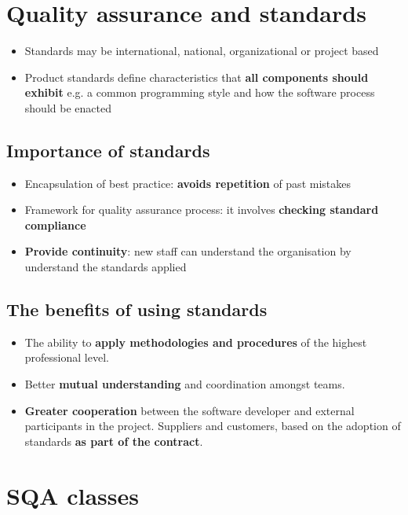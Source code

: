 \documentclass{article}
\begin{document}
\tableofcontents

\newpage

\section{Quality assurance and standards}
\begin{itemize}
  \item Standards may be international, national, organizational or project based
  \item Product standards define characteristics that \textbf{all components should exhibit} e.g. a common programming style and how the software process should be enacted
\end{itemize}

\subsection{Importance of standards}
\begin{itemize}
  \item Encapsulation of best practice: \textbf{avoids repetition} of past mistakes
  \item Framework for quality assurance process: it involves \textbf{checking standard compliance}
  \item \textbf{Provide continuity}: new staff can understand the organisation by understand the standards applied
\end{itemize}

\subsection{The benefits of using standards}
\begin{itemize}
  \item The ability to \textbf{apply methodologies and procedures} of the highest professional level.
  \item Better \textbf{mutual understanding} and coordination amongst teams.
  \item \textbf{Greater cooperation} between the software developer and external participants in the project. Suppliers and customers, based on the adoption of standards \textbf{as part of the contract}.
\end{itemize}

\section{SQA classes}
\end{document}
